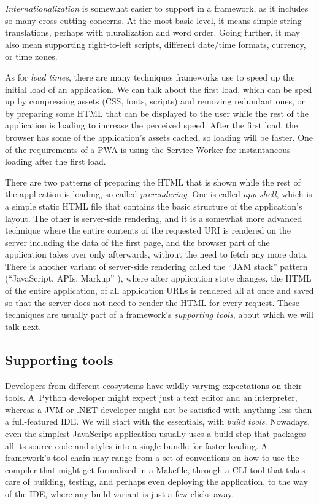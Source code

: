 \documentclass[english,zadani,odsaz]{fitthesis}
\begin{document}
\emph{Internationalization} is somewhat easier to support in a framework, as it
includes so many cross-cutting concerns. At the most basic level, it means
simple string translations, perhaps with pluralization and word order. Going
further, it may also mean supporting right-to-left scripts, different date/time
formats, currency, or time zones.

As for \emph{load times}, there are many techniques frameworks use to speed up the
initial load of an application. We can talk about the first load, which can be
sped up by compressing assets (CSS, fonts, scripts) and removing redundant ones,
or by preparing some HTML that can be displayed to the user while the rest of
the application is loading to increase the perceived speed. After the first
load, the browser has some of the application's assets cached, so loading will
be faster. One of the requirements of a PWA is using the Service Worker for
instantaneous loading after the first load.

There are two patterns of preparing the HTML that is shown while the rest of the
application is loading, so called \emph{prerendering}. One is called \emph{app shell}, which
is a simple static HTML file that contains the basic structure of the
application's layout. The other is server-side rendering, and it is a somewhat
more advanced technique where the entire contents of the requested URI is
rendered on the server including the data of the first page, and the browser
part of the application takes over only afterwards, without the need to fetch
any more data. There is another variant of server-side rendering called the ``JAM
stack'' pattern (``JavaScript, APIs, Markup'' \cite{jamstack}), where after
application state changes, the HTML of the entire application, of all
application URLs is rendered all at once and saved so that the server does not
need to render the HTML for every request. These techniques are usually part of
a framework's \emph{supporting tools}, about which we will talk next.

\subsection{Supporting tools}
\label{sec:org4ef450c}
Developers from different ecosystems have wildly varying expectations on their
tools. A~Python developer might expect just a text editor and an
interpreter, whereas a JVM or .NET developer might not be satisfied with
anything less than a full-featured IDE. We will start with the essentials, with
\emph{build tools}. Nowadays, even the simplest JavaScript application usually uses a
build step that packages all its source code and styles into a single bundle for
faster loading. A framework's tool-chain may range from a set of conventions on
how to use the compiler that might get formalized in a Makefile, through a CLI
tool that takes care of building, testing, and perhaps even deploying the
application, to the way of the IDE, where any build variant is just a few clicks
away.
\end{document}
